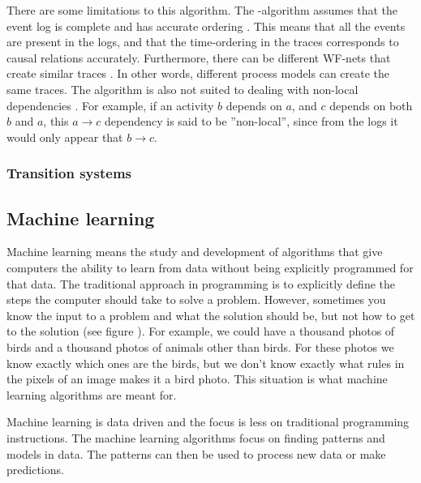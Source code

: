 There are some limitations to this algorithm.
The \textalpha-algorithm assumes that the event log is complete and has accurate ordering \cite{van2013discovering}. This means that all the events are present in the logs, and that the time-ordering in the traces corresponds to causal relations accurately. Furthermore, there can be different WF-nets that create similar traces \cite{van2013discovering}. In other words, different process models can create the same traces.
The algorithm is also not suited to dealing with non-local dependencies \cite{van2013discovering}.
For example, if an activity $b$ depends on $a$, and $c$ depends on both $b$ and $a$, this $a \rightarrow c$ dependency is said to be ''non-local'', since from the logs it would only appear that $b \rightarrow c$. 

\subsubsection{Transition systems}




\subsection{Machine learning}

Machine learning means the study and development of algorithms that give computers the ability to learn from data without being explicitly programmed for that data. 
The traditional approach in programming is to explicitly define the steps the computer should take to solve a problem.
However, sometimes you know the input to a problem and what the solution should be, but not how to get to the solution (see figure ).
For example, we could have a thousand photos of birds and a thousand photos of animals other than birds.
For these photos we know exactly which ones are the birds, but we don't know exactly what rules in the pixels of an image makes it a bird photo.
This situation is what machine learning algorithms are meant for.

Machine learning is data driven and the focus is less on traditional programming instructions.
The machine learning algorithms focus on finding patterns and models in data.
The patterns can then be used to process new data or make predictions.

